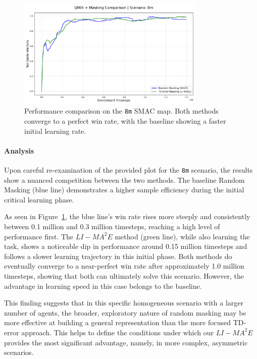 \begin{figure}[h]
    \centering
    \includegraphics[width=0.8\textwidth]{images_pfe/results_li-ma2e/comparison_plot_8m.png}
    \caption{Performance comparison on the \texttt{8m} SMAC map. Both methods converge to a perfect win rate, with the baseline showing a faster initial learning rate.}
    \label{fig:8m}
\end{figure}
\paragraph{Analysis}
Upon careful re-examination of the provided plot for the \texttt{8m} scenario, the results show a nuanced competition between the two methods. The baseline Random Masking (blue line) demonstrates a higher sample efficiency during the initial critical learning phase.

As seen in Figure~\ref{fig:8m}, the blue line's win rate rises more steeply and consistently between 0.1 million and 0.3 million timesteps, reaching a high level of performance first. The $LI-{MA}^2E$ method (green line), while also learning the task, shows a noticeable dip in performance around 0.15 million timesteps and follows a slower learning trajectory in this initial phase. Both methods do eventually converge to a near-perfect win rate after approximately 1.0 million timesteps, showing that both can ultimately solve this scenario. However, the advantage in learning speed in this case belongs to the baseline.

This finding suggests that in this specific homogeneous scenario with a larger number of agents, the broader, exploratory nature of random masking may be more effective at building a general representation than the more focused TD-error approach. This helps to define the conditions under which our $LI-{MA}^2E$ provides the most significant advantage, namely, in more complex, asymmetric scenarios.


